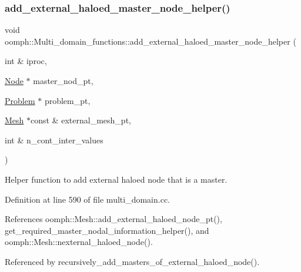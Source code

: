 \subsubsection{\texorpdfstring{add\+\_\+external\+\_\+haloed\+\_\+master\+\_\+node\+\_\+helper()}{add\_external\_haloed\_master\_node\_helper()}}
{\footnotesize\ttfamily void oomph\+::\+Multi\+\_\+domain\+\_\+functions\+::add\+\_\+external\+\_\+haloed\+\_\+master\+\_\+node\+\_\+helper (\begin{DoxyParamCaption}\item[{int \&}]{iproc,  }\item[{\hyperlink{classoomph_1_1Node}{Node} $\ast$}]{master\+\_\+nod\+\_\+pt,  }\item[{\hyperlink{classoomph_1_1Problem}{Problem} $\ast$}]{problem\+\_\+pt,  }\item[{\hyperlink{classoomph_1_1Mesh}{Mesh} $\ast$const \&}]{external\+\_\+mesh\+\_\+pt,  }\item[{int \&}]{n\+\_\+cont\+\_\+inter\+\_\+values }\end{DoxyParamCaption})}



Helper function to add external haloed node that is a master. 



Definition at line 590 of file multi\+\_\+domain.\+cc.



References oomph\+::\+Mesh\+::add\+\_\+external\+\_\+haloed\+\_\+node\+\_\+pt(), get\+\_\+required\+\_\+master\+\_\+nodal\+\_\+information\+\_\+helper(), and oomph\+::\+Mesh\+::nexternal\+\_\+haloed\+\_\+node().



Referenced by recursively\+\_\+add\+\_\+masters\+\_\+of\+\_\+external\+\_\+haloed\+\_\+node().

\mbox{\label{namespaceoomph_1_1Multi__domain__functions_aac4036d305c98081e778e16d568ae560}} 
